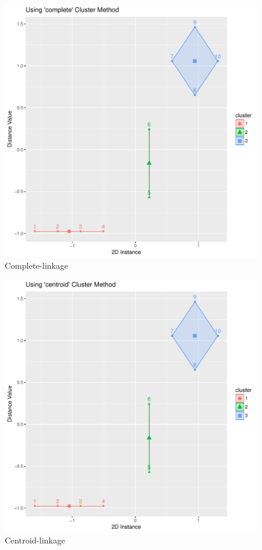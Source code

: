 \documentclass[letterpaper,11pt]{article}
\begin{document}
\begin{figure}[h]
\centering
\includegraphics[scale=0.45]{complete.pdf}
\caption{Complete-linkage}
\label{fig:3}
\end{figure}

\begin{figure}[h]
\centering
\includegraphics[scale=0.45]{centroid.pdf}
\caption{Centroid-linkage}
\label{fig:4}
\end{figure}
\end{document}
